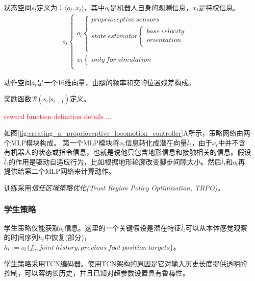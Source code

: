 状态空间$s_t$定义为：$\langle o_t, x_t\rangle$，其中$o_t$是机器人自身的观测信息，$x_t$是特权信息。
\begin{align}
    s_t\begin{cases}
        o_t\begin{cases}
            proprioceptive\ sensors\\
            state\ estimator\begin{cases}
                base\ velocity\\
                orientation\\
            \end{cases}\\
        \end{cases}\\
        x_t\begin{cases}
            only\ for\ simulation
        \end{cases}\\
    \end{cases}
\end{align}

动作空间$\overline a_t$是一个16维向量，由腿的频率和交的位置残差构成。

奖励函数$\mathcal{R}(s_t|s_{t+1})$定义。

\textcolor{red}{reward function definition details ...}

如图\ref{fig:creating_a_proprioceptive_locomotion_controller}A所示，策略网络由两个MLP模块构成。
第一个MLP模块将$x_t$信息转化成潜在向量$\overline{l}_t$，由于$x_t$中并不含有机器人的状态或指令信息，也就是说他只包含地形信息和接触相关的信息。假设$\overline{l}_t$的作用是驱动自适应行为，比如根据地形轮廓改变脚步间隙大小。然后$\overline{l}_t$和$o_t$再提供给第二个MLP网络来计算动作。

训练采用\emph{信任区域策略优化(Trust Region Policy Optimization, TRPO)}\cite[p]{Schulman_Levine_Moritz_Jordan_Abbeel_2015}。

\subsubsection[学生策略]{学生策略}

学生策略仅能获取$o_t$信息。这里的一个关键假设是潜在特征$\overline{l}_t$可以从本体感觉观察的时间序列$h_t$中恢复(部分)，$h_t:=o_t\{f_o, joint\ history, previous\ foot\ position\ targets \}$。

学生策略采用TCN\cite[p]{Bai_Kolter_Koltun_2018}编码器。使用TCN架构的原因是它对输入历史长度提供透明的控制，可以容纳长历史，并且已知对超参数设置具有鲁棒性\cite[p]{Bai_Kolter_Koltun_2018}。

